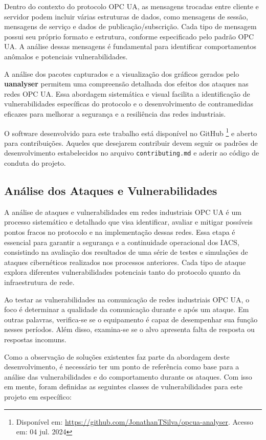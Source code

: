         Dentro do contexto do protocolo OPC UA, as mensagens trocadas entre cliente e servidor podem incluir várias estruturas de dados, como mensagens de sessão, mensagens de serviço e dados de publicação/subscrição. Cada tipo de mensagem possui seu próprio formato e estrutura, conforme especificado pelo padrão OPC UA. A análise dessas mensagens é fundamental para identificar comportamentos anômalos e potenciais vulnerabilidades.

        A análise dos pacotes capturados e a visualização dos gráficos gerados pelo \textbf{uanalyser} permitem uma compreensão detalhada dos efeitos dos ataques nas redes OPC UA. Essa abordagem sistemática e visual facilita a identificação de vulnerabilidades específicas do protocolo e o desenvolvimento de contramedidas eficazes para melhorar a segurança e a resiliência das redes industriais.

        O software desenvolvido para este trabalho está disponível no GitHub \footnote{Disponível em: \url{https://github.com/JonathanTSilva/opcua-analyser}. Acesso em: 04 jul. 2024} e aberto para contribuições. Aqueles que desejarem contribuir devem seguir os padrões de desenvolvimento estabelecidos no arquivo \texttt{contributing.md} e aderir ao código de conduta do projeto.

    \subsection{Análise dos Ataques e Vulnerabilidades}

        A análise de ataques e vulnerabilidades em redes industriais OPC UA é um processo sistemático e detalhado que visa identificar, avaliar e mitigar possíveis pontos fracos no protocolo e na implementação dessas redes. Essa etapa é essencial para garantir a segurança e a continuidade operacional dos IACS, consistindo na avaliação dos resultados de uma série de testes e simulações de ataques cibernéticos realizados nos processos anteriores. Cada tipo de ataque explora diferentes vulnerabilidades potenciais tanto do protocolo quanto da infraestrutura de rede.

        Ao testar as vulnerabilidades na comunicação de redes industriais OPC UA, o foco é determinar a qualidade da comunicação durante e após um ataque. Em outras palavras, verifica-se se o equipamento é capaz de desempenhar sua função nesses períodos. Além disso, examina-se se o alvo apresenta falta de resposta ou respostas incomuns.

        Como a observação de soluções existentes faz parte da abordagem deste desenvolvimento, é necessário ter um ponto de referência como base para a análise das vulnerabilidades e do comportamento durante os ataques. Com isso em mente, foram definidas as seguintes classes de vulnerabilidades para este projeto em específico:


